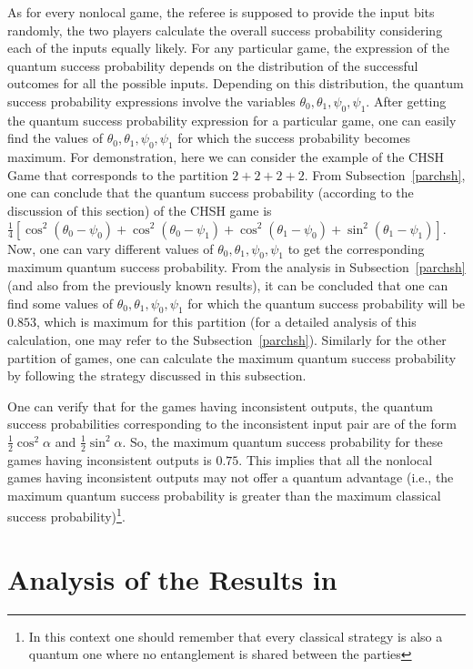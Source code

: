\documentclass[]{svjour3}
\begin{document}
As for every nonlocal game, the referee is supposed to provide the input bits randomly, the two players calculate the overall success probability considering each of the inputs equally likely. For any particular game, the expression of the quantum success probability depends on the distribution of the successful outcomes for all the possible inputs. Depending on this distribution, the quantum success probability expressions involve the variables $\theta_0, \theta_1, \psi_0, \psi_1$. After getting the quantum success probability expression for a particular game, one can easily find the values of $\theta_0, \theta_1, \psi_0, \psi_1$ for which the success probability becomes maximum. For demonstration, here we can consider the example of the CHSH Game that corresponds to the partition $2+2+2+2$. From Subsection~\ref{parchsh}, one can conclude that the quantum success probability (according to the discussion of this section) of the CHSH game is $\frac{1}{4} \left[\cos^2(\theta_0 - \psi_0) + \cos^2(\theta_0 - \psi_1) + \cos^2(\theta_1 - \psi_0) + \sin^2(\theta_1 - \psi_1)\right]$. Now, one can vary different values of $\theta_0, \theta_1, \psi_0, \psi_1$ to get the corresponding maximum quantum success probability. From the analysis in Subsection~\ref{parchsh} (and also from the previously known results), it can be concluded that one can find some values of $\theta_0, \theta_1, \psi_0, \psi_1$ for which the quantum success probability will be $0.853$, which is maximum for this partition (for a detailed analysis of this calculation, one may refer to the Subsection~\ref{parchsh}). Similarly for the other partition of games, one can calculate the maximum quantum success probability by following the strategy discussed in this subsection.  

One can verify that for the games having inconsistent outputs, the quantum success probabilities corresponding to the inconsistent input pair are of the form $\frac{1}{2}\cos^2\alpha$ and $\frac{1}{2}\sin^2\alpha$. So, the maximum quantum success probability for these games having inconsistent outputs is $0.75$. This implies that all the nonlocal games having inconsistent outputs may not offer a quantum advantage (i.e., the maximum quantum success probability is greater than the maximum classical success probability)\footnote{In this context one should remember that every classical strategy is also a quantum one where no entanglement is shared between the parties}.



\section{Analysis of the Results in \cite{NGA19}}
\label{error}
\end{document}
